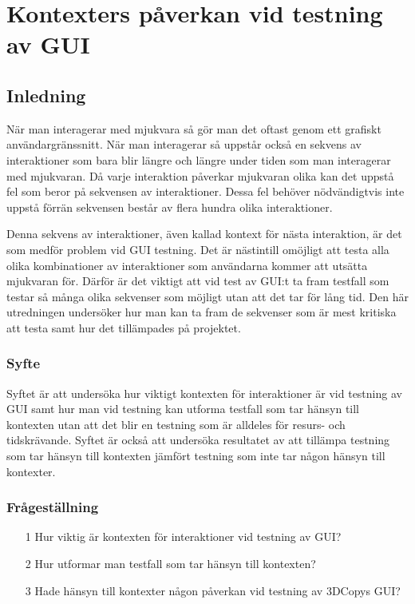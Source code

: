 \chapter{Kontexters påverkan vid testning av GUI}
\label{cha:indiv-report-holmberg}

\section{Inledning}
\label{sec:introduction-holmberg}

När man interagerar med mjukvara så gör man det oftast genom ett grafiskt användargränssnitt. När man interagerar så uppstår också en sekvens av interaktioner som bara blir längre och längre under tiden som man interagerar med mjukvaran. Då varje interaktion påverkar mjukvaran olika kan det uppstå fel som beror på sekvensen av interaktioner. Dessa fel behöver nödvändigtvis inte uppstå förrän sekvensen består av flera hundra olika interaktioner.

Denna sekvens av interaktioner, även kallad kontext för nästa interaktion, är det som medför problem vid GUI testning. Det är nästintill omöjligt att testa alla olika kombinationer av interaktioner som användarna kommer att utsätta mjukvaran för. Därför är det viktigt att vid test av GUI:t ta fram testfall som testar så många olika sekvenser som möjligt utan att det tar för lång tid. Den här utredningen undersöker hur man kan ta fram de sekvenser som är mest kritiska att testa samt hur det tillämpades på projektet.

\subsection{Syfte}
\label{sec:purpose-holmberg}

Syftet är att undersöka hur viktigt kontexten för interaktioner är vid testning av GUI samt hur man vid testning kan utforma testfall som tar hänsyn till kontexten utan att det blir en testning som är alldeles för resurs- och tidskrävande. Syftet är också att undersöka resultatet av att tillämpa testning som tar hänsyn till kontexten jämfört testning som inte tar någon hänsyn till kontexter.

\subsection{Frågeställning}
\label{sec:issue-holmberg}

\begin{itemize}
	\item [1] Hur viktig är kontexten för interaktioner vid testning av GUI?
	\item [2] Hur utformar man testfall som tar hänsyn till kontexten?
	\item [3] Hade hänsyn till kontexter någon påverkan vid testning av 3DCopys GUI?
\end{itemize}

